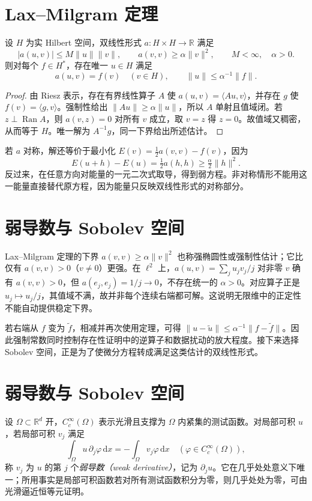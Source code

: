 \section{Lax--Milgram 定理}
\begin{theorem}\label{thm:fa-lax-milgram}
设 $H$ 为实 Hilbert 空间，双线性形式 $a:H\times H\to\mathbb R$ 满足
\[
 |a(u,v)|\leq M\|u\|\|v\|,\qquad
 a(v,v)\geq\alpha\|v\|^2,
 \qquad M<\infty,\quad\alpha>0.
\]
则对每个 $f\in H^*$，存在唯一 $u\in H$ 满足
\begin{equation}
 a(u,v)=f(v)\quad(v\in H),\qquad
 \|u\|\leq\alpha^{-1}\|f\|.
 \label{eq:fa-lax-milgram}
\end{equation}
\end{theorem}
\begin{proof}
由 Riesz 表示，存在有界线性算子 $A$ 使 $a(u,v)=\langle Au,v\rangle$，并存在 $g$ 使 $f(v)=\langle g,v\rangle$。强制性给出 $\|Au\|\geq\alpha\|u\|$，所以 $A$ 单射且值域闭。若 $z\perp\operatorname{Ran}A$，则 $a(v,z)=0$ 对所有 $v$ 成立，取 $v=z$ 得 $z=0$。故值域又稠密，从而等于 $H$。唯一解为 $A^{-1}g$，同一下界给出所述估计。
\end{proof}
若 $a$ 对称，解还等价于最小化 $E(v)=\frac12a(v,v)-f(v)$，因为
\[
 E(u+h)-E(u)=\tfrac12a(h,h)\geq\tfrac\alpha2\|h\|^2.
\]
反过来，在任意方向对能量的一元二次式取导，得到弱方程。非对称情形不能用这一能量直接替代原方程，因为能量只反映双线性形式的对称部分。

\section{弱导数与 Sobolev 空间}
Lax--Milgram 定理的下界 $a(v,v)\geq\alpha\|v\|^2$ 也称强椭圆性或强制性估计；它比仅有 $a(v,v)>0$（$v\ne0$）更强。在 $\ell^2$ 上，$a(u,v)=\sum_ju_jv_j/j$ 对非零 $v$ 确有 $a(v,v)>0$，但 $a(e_j,e_j)=1/j\to0$，不存在统一的 $\alpha>0$。对应算子正是 $u_j\mapsto u_j/j$，其值域不满，故并非每个连续右端都可解。这说明无限维中的正定性不能自动提供稳定下界。

若右端从 $f$ 变为 $\widetilde f$，相减并再次使用定理，可得 $\|u-\widetilde u\|\leq\alpha^{-1}\|f-\widetilde f\|$。因此强制常数同时控制存在性证明中的逆算子和数据扰动的放大程度。接下来选择 Sobolev 空间，正是为了使微分方程转成满足这类估计的双线性形式。

\section{弱导数与 Sobolev 空间}
设 $\Omega\subset\mathbb R^d$ 开，$C_c^\infty(\Omega)$ 表示光滑且支撑为 $\Omega$ 内紧集的测试函数。对局部可积 $u$，若局部可积 $v_j$ 满足
\[
 \int_\Omega u\,\partial_j\varphi\,\mathrm dx
 =-\int_\Omega v_j\varphi\,\mathrm dx
 \quad(\varphi\in C_c^\infty(\Omega)),
\]
称 $v_j$ 为 $u$ 的第 $j$ 个\emph{弱导数（weak derivative）}，记为 $\partial_ju$。它在几乎处处意义下唯一；所用事实是局部可积函数若对所有测试函数积分为零，则几乎处处为零，可由光滑逼近恒等元证明。

